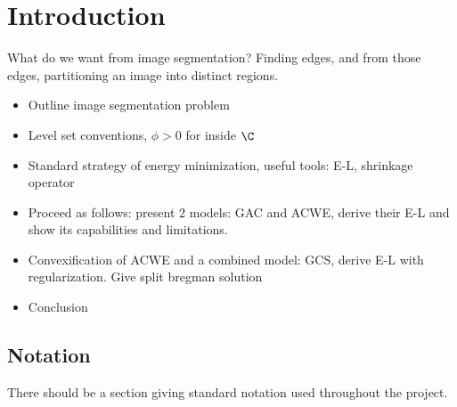 \chapter{Introduction}
What do we want from image segmentation? Finding edges, and from those edges, partitioning an image into distinct regions.

\begin{itemize}
	\item Outline image segmentation problem 
	
	\item Level set conventions, $\phi>0$ for inside $\C$
	
	\item Standard strategy of energy minimization, useful tools: E-L, shrinkage operator
	
	\item Proceed as follows: present 2 models: GAC and ACWE, derive their E-L and show its capabilities and limitations.
	
	\item Convexification of ACWE and a combined model: GCS, derive E-L with regularization. Give split bregman solution
	
	\item Conclusion
\end{itemize}

\section{Notation}
There should be a section giving standard notation used throughout the project.


